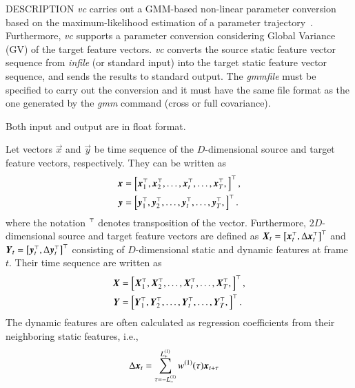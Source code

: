 \begin{qsection}{DESCRIPTION}
 {\em vc} carries out a GMM-based non-linear parameter conversion based on the
 maximum-likelihood estimation of a parameter trajectory~\cite{ref:vc-IEEETASLP}.
 Furthermore, {\em vc} supports a parameter conversion considering Global Variance
 (GV) of the target feature vectors.  {\em vc} converts the source static feature
 vector sequence from {\em infile} (or standard input) into the target static feature
 vector sequence, and sends the results to standard output. The {\em gmmfile} must be
 specified to carry out the conversion and it must have the same file format as the
 one generated by the {\em gmm} command (cross or full covariance).

 Both input and output are in float format.

 Let vectors $\vec{x}$ and $\vec{y}$ be time sequence of the $D$-dimensional source
 and target feature vectors, respectively.  They can be written as
 \begin{align*}
  \mbox{\boldmath $x$} & = \left[\mbox{\boldmath $x$}_{1}^{\top}, \mbox{\boldmath $x$}_{2}^{\top}, \ldots,
                 \mbox{\boldmath $x$}_{t}^{\top},\ldots, \mbox{\boldmath $x$}_{T}^{\top},\right]^{\top}, \\
  \mbox{\boldmath $y$} & = \left[\mbox{\boldmath $y$}_{1}^{\top}, \mbox{\boldmath $y$}_{2}^{\top}, \ldots,
                 \mbox{\boldmath $y$}_{t}^{\top},\ldots, \mbox{\boldmath $y$}_{T}^{\top},\right]^{\top}.
 \end{align*}
 where the notation ${}^{\top}$ denotes transposition of the vector.  Furthermore,
 $2D$-dimensional source and target feature vectors are defined as $\mbox{\boldmath $X$}_{t} =
 \left[\mbox{\boldmath $x$}_{t}^{\top}, \Delta\mbox{\boldmath $x$}_{t}^{\top}\right]^{\top}$ and $\mbox{\boldmath $Y$}_{t} =
 \left[\mbox{\boldmath $y$}_{t}^{\top}, \Delta\mbox{\boldmath $y$}_{t}^{\top}\right]^{\top}$ consisting of
 $D$-dimensional static and dynamic features at frame $t$.  Their time sequence are
 written as
  \begin{align*}
  \mbox{\boldmath $X$} & = \left[\mbox{\boldmath $X$}_{1}^{\top}, \mbox{\boldmath $X$}_{2}^{\top}, \ldots,
                 \mbox{\boldmath $X$}_{t}^{\top},\ldots, \mbox{\boldmath $X$}_{T}^{\top},\right]^{\top}, \\
  \mbox{\boldmath $Y$} & = \left[\mbox{\boldmath $Y$}_{1}^{\top}, \mbox{\boldmath $Y$}_{2}^{\top}, \ldots,
                 \mbox{\boldmath $Y$}_{t}^{\top},\ldots, \mbox{\boldmath $Y$}_{T}^{\top},\right]^{\top}.
 \end{align*}
 The dynamic features are often calculated as regression coefficients from their
 neighboring static features, i.e.,
  \begin{align*}
  \Delta \mbox{\boldmath $x$}_{t} &= \displaystyle\sum\limits_{\tau=-L^{(1)}_{-}}^{L^{(1)}_{+}}
 w^{(1)}(\tau)\mbox{\boldmath $x$}_{t + \tau}
  \end{align*}

\end{qsection}
